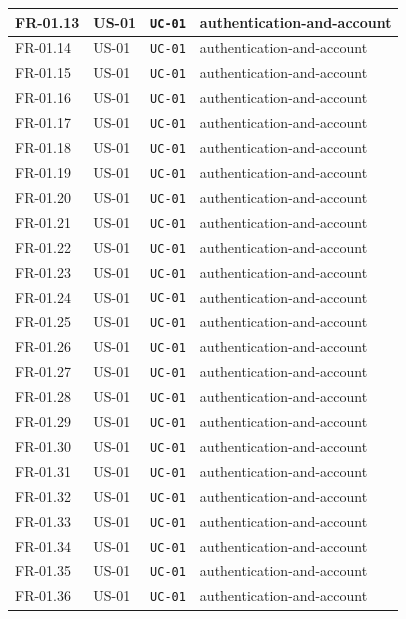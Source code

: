 \documentclass[12pt]{article}
\begin{document}
\begin{longtable}{|>{\raggedright\arraybackslash}p{}|>{\raggedright\arraybackslash}p{}|>{\raggedright\arraybackslash}p{}|>{\raggedright\arraybackslash}p{}|}
FR-01.13 & US-01 & \texttt{UC-01} & authentication-and-account \\ \hline
FR-01.14 & US-01 & \texttt{UC-01} & authentication-and-account \\ \hline
FR-01.15 & US-01 & \texttt{UC-01} & authentication-and-account \\ \hline
FR-01.16 & US-01 & \texttt{UC-01} & authentication-and-account \\ \hline
FR-01.17 & US-01 & \texttt{UC-01} & authentication-and-account \\ \hline
FR-01.18 & US-01 & \texttt{UC-01} & authentication-and-account \\ \hline
FR-01.19 & US-01 & \texttt{UC-01} & authentication-and-account \\ \hline
FR-01.20 & US-01 & \texttt{UC-01} & authentication-and-account \\ \hline
FR-01.21 & US-01 & \texttt{UC-01} & authentication-and-account \\ \hline
FR-01.22 & US-01 & \texttt{UC-01} & authentication-and-account \\ \hline
FR-01.23 & US-01 & \texttt{UC-01} & authentication-and-account \\ \hline
FR-01.24 & US-01 & \texttt{UC-01} & authentication-and-account \\ \hline
FR-01.25 & US-01 & \texttt{UC-01} & authentication-and-account \\ \hline
FR-01.26 & US-01 & \texttt{UC-01} & authentication-and-account \\ \hline
FR-01.27 & US-01 & \texttt{UC-01} & authentication-and-account \\ \hline
FR-01.28 & US-01 & \texttt{UC-01} & authentication-and-account \\ \hline
FR-01.29 & US-01 & \texttt{UC-01} & authentication-and-account \\ \hline
FR-01.30 & US-01 & \texttt{UC-01} & authentication-and-account \\ \hline
FR-01.31 & US-01 & \texttt{UC-01} & authentication-and-account \\ \hline
FR-01.32 & US-01 & \texttt{UC-01} & authentication-and-account \\ \hline
FR-01.33 & US-01 & \texttt{UC-01} & authentication-and-account \\ \hline
FR-01.34 & US-01 & \texttt{UC-01} & authentication-and-account \\ \hline
FR-01.35 & US-01 & \texttt{UC-01} & authentication-and-account \\ \hline
FR-01.36 & US-01 & \texttt{UC-01} & authentication-and-account \\ \hline

\end{longtable}
\end{document}
